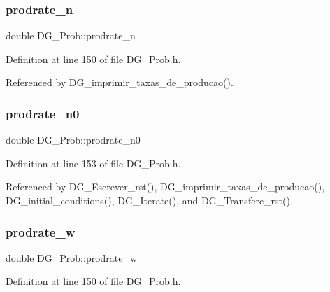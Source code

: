 \subsubsection{\texorpdfstring{prodrate\+\_\+n}{prodrate\_n}}
{\footnotesize\ttfamily double D\+G\+\_\+\+Prob\+::prodrate\+\_\+n\hspace{0.3cm}{\ttfamily [private]}}



Definition at line 150 of file D\+G\+\_\+\+Prob.\+h.



Referenced by D\+G\+\_\+imprimir\+\_\+taxas\+\_\+de\+\_\+producao().

\mbox{\label{classDG__Prob_ab075a283993b498c0a9d224f33831ec2}} 
\subsubsection{\texorpdfstring{prodrate\+\_\+n0}{prodrate\_n0}}
{\footnotesize\ttfamily double D\+G\+\_\+\+Prob\+::prodrate\+\_\+n0\hspace{0.3cm}{\ttfamily [private]}}



Definition at line 153 of file D\+G\+\_\+\+Prob.\+h.



Referenced by D\+G\+\_\+\+Escrever\+\_\+rst(), D\+G\+\_\+imprimir\+\_\+taxas\+\_\+de\+\_\+producao(), D\+G\+\_\+initial\+\_\+conditions(), D\+G\+\_\+\+Iterate(), and D\+G\+\_\+\+Transfere\+\_\+rst().

\mbox{\label{classDG__Prob_a96bd3f227a29c258f7ee0b61ab5e5f78}} 
\subsubsection{\texorpdfstring{prodrate\+\_\+w}{prodrate\_w}}
{\footnotesize\ttfamily double D\+G\+\_\+\+Prob\+::prodrate\+\_\+w\hspace{0.3cm}{\ttfamily [private]}}



Definition at line 150 of file D\+G\+\_\+\+Prob.\+h.



